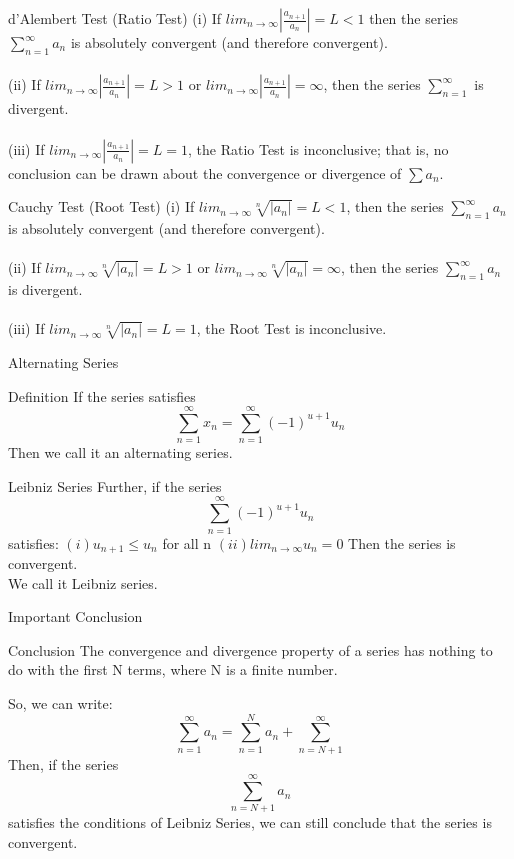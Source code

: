 \documentclass{beamer}
\begin{document}
\begin{frame}{d’Alembert Test (Ratio Test)}
    (i) If $lim_{n\rightarrow \infty}|\frac{a_{n+1}}{a_n}|=L<1$ then the series $\sum_{n=1}^{\infty} a_n$  is absolutely convergent (and therefore convergent).\\~\\
(ii) If $lim_{n\rightarrow \infty}|\frac{a_{n+1}}{a_n}|=L>1$ or $lim_{n\rightarrow \infty}|\frac{a_{n+1}}{a_n}|=\infty$, then the series $\sum_{n=1}^{\infty}$ is divergent.\\~\\
(iii) If $lim_{n\rightarrow \infty}|\frac{a_{n+1}}{a_n}|=L=1$, the Ratio Test is inconclusive; that is, no conclusion can be drawn about the convergence or divergence of $\sum a_n$.
\end{frame}
\begin{frame}{Cauchy Test (Root Test)}
    (i) If $lim_{n \rightarrow \infty} \sqrt[n]{|a_n|} =L<1 $, then the series $\sum _{n=1}^{\infty} a_n$  is absolutely convergent (and therefore convergent).\\~\\
(ii) If $lim_{n \rightarrow \infty} \sqrt[n]{|a_n|} =L>1 $ or $lim_{n \rightarrow \infty} \sqrt[n]{|a_n|} = \infty $, then the series $\sum _{n=1}^{\infty} a_n$ is divergent.\\~\\
(iii) If $lim_{n \rightarrow \infty} \sqrt[n]{|a_n|} =L=1 $, the Root Test is inconclusive.
\end{frame}

\begin{frame}{Alternating Series}
    \begin{block}{Definition}
        If the series satisfies
$$\sum\limits_{n=1}^{\infty}x_n=\sum\limits_{n=1}^{\infty}(-1)^{u+1} u_n$$
Then we call it an alternating series.
    \end{block}
\end{frame}

\begin{frame}{Leibniz Series}
    Further, if the series
    $$\sum\limits_{n=1}^{\infty}(-1)^{u+1} u_n$$
    satisfies:
    $(i) u_{n+1} \leqslant u_n$ for all n
    $(ii) lim_{n\rightarrow \infty}u_n=0$
    Then the series is convergent. \\
    We call it Leibniz series.
\end{frame}

\begin{frame}{Important Conclusion}
    \begin{block}{Conclusion}
        The convergence and divergence property of a series has nothing to do with the first N terms, where N is a finite number.    
    \end{block}
    So, we can write:
    $$\sum_{n=1}^{\infty}a_n= \sum_{n=1}^{N} a_n+ \sum _{n=N+1}^{\infty}$$
    Then, if the series
    $$\sum_{n=N+1}^{\infty} a_n$$
    satisfies the conditions of Leibniz Series, we can still conclude that the series is convergent.
\end{frame}
\end{document}

